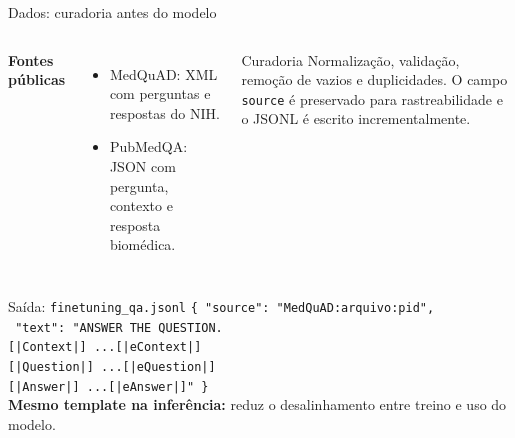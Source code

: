 \documentclass[aspectratio=169,11pt]{beamer}
\begin{document}
\begin{frame}{Dados: curadoria antes do modelo}
  \small
  \begin{columns}[T,onlytextwidth]
    \textbf{Fontes públicas}
    \begin{itemize}
      \item MedQuAD: XML com perguntas e respostas do NIH.
      \item PubMedQA: JSON com pergunta, contexto e resposta biomédica.
    \end{itemize}
    \begin{block}{Curadoria}
      Normalização, validação, remoção de vazios e duplicidades. O campo \texttt{source} é preservado para rastreabilidade e o JSONL é escrito incrementalmente.
    \end{block}
    \vspace{0.05cm}
  \end{columns}
  \vspace{0.08cm}
  \begin{block}{Saída: \texttt{finetuning\_qa.jsonl}}
      \scriptsize
      \texttt{\{ "source": "MedQuAD:arquivo:pid",}\\[-0.02cm]
      \texttt{  "text": "ANSWER THE QUESTION.}\\
      \texttt{[|Context|] ...[|eContext|]}\\[-0.02cm]
      \texttt{[|Question|] ...[|eQuestion|]}\\[-0.02cm]
      \texttt{[|Answer|] ...[|eAnswer|]" \}}\\[0.08cm]
      \textbf{Mesmo template na inferência:} reduz o desalinhamento entre treino e uso do modelo.
  \end{block}
\end{frame}
\end{document}
